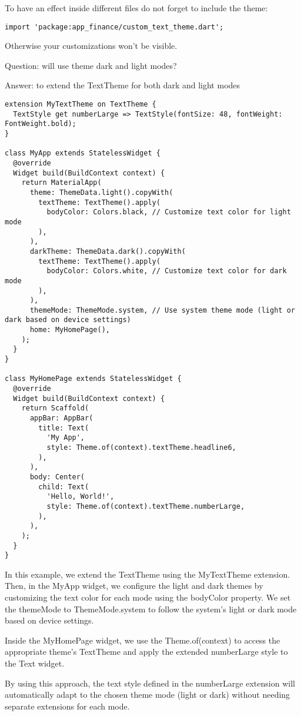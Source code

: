 To have an effect inside different files do not forget to include the theme:
\begin{lstlisting}
import 'package:app_finance/custom_text_theme.dart';
\end{lstlisting}

Otherwise your customizations won't be visible.



Question: will use theme dark and light modes?

Answer: to extend the TextTheme for both dark and light modes

\begin{lstlisting}
extension MyTextTheme on TextTheme {
  TextStyle get numberLarge => TextStyle(fontSize: 48, fontWeight: FontWeight.bold);
}

class MyApp extends StatelessWidget {
  @override
  Widget build(BuildContext context) {
    return MaterialApp(
      theme: ThemeData.light().copyWith(
        textTheme: TextTheme().apply(
          bodyColor: Colors.black, // Customize text color for light mode
        ),
      ),
      darkTheme: ThemeData.dark().copyWith(
        textTheme: TextTheme().apply(
          bodyColor: Colors.white, // Customize text color for dark mode
        ),
      ),
      themeMode: ThemeMode.system, // Use system theme mode (light or dark based on device settings)
      home: MyHomePage(),
    );
  }
}

class MyHomePage extends StatelessWidget {
  @override
  Widget build(BuildContext context) {
    return Scaffold(
      appBar: AppBar(
        title: Text(
          'My App',
          style: Theme.of(context).textTheme.headline6,
        ),
      ),
      body: Center(
        child: Text(
          'Hello, World!',
          style: Theme.of(context).textTheme.numberLarge,
        ),
      ),
    );
  }
}
\end{lstlisting}

In this example, we extend the TextTheme using the MyTextTheme extension. Then, in the MyApp widget, we configure the 
light and dark themes by customizing the text color for each mode using the bodyColor property. We set the themeMode 
to ThemeMode.system to follow the system's light or dark mode based on device settings.

Inside the MyHomePage widget, we use the Theme.of(context) to access the appropriate theme's TextTheme and apply 
the extended numberLarge style to the Text widget.

By using this approach, the text style defined in the numberLarge extension will automatically adapt to the chosen 
theme mode (light or dark) without needing separate extensions for each mode.


